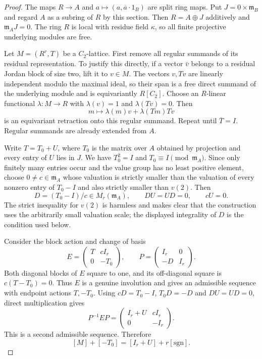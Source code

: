 \begin{proof}
The maps $R\to A$ and
$a\mapsto(a,\overline a\cdot1_B)$ are split ring maps. Put
$J=0\times\mathfrak m_B$ and regard $A$ as a subring of $R$ by this
section. Then $R=A\oplus J$ additively and $\mathfrak m_AJ=0$.
The ring $R$ is local with residue field $\kappa$, so all finite
projective underlying modules are free.

Let $M=(R^r,T)$ be a $C_2$-lattice. First remove all regular summands
of its residual representation. To justify this directly, if a vector
$\bar v$ belongs to a residual Jordan block of size two, lift it to
$v\in M$. The vectors $v,Tv$ are linearly independent modulo the
maximal ideal, so their span is a free direct summand of the underlying
module and is equivariantly $R[C_2]$. Choose an $R$-linear functional
$\lambda:M\to R$ with $\lambda(v)=1$ and $\lambda(Tv)=0$.
Then
\[
             m\longmapsto\lambda(m)v+\lambda(Tm)Tv
\]
is an equivariant retraction onto this regular summand. Repeat until
$\overline T=I$. Regular summands are already extended from $A$.

Write $T=T_0+U$, where $T_0$ is the matrix over $A$ obtained by
projection and every entry of $U$ lies in $J$. We have $T_0^2=I$
and $T_0\equiv I\pmod{\mathfrak m_A}$.
Since only finitely many entries occur and the value group has no
least positive element, choose $0\ne c\in\mathfrak m_A$ whose
valuation is strictly smaller than the valuation of every nonzero
entry of $T_0-I$ and also strictly smaller than $v(2)$. Then
\[
           D=(T_0-I)/c\in M_r(\mathfrak m_A),
           \qquad DU=UD=0,\qquad cU=0.
\]
The strict inequality for $v(2)$ is harmless and makes clear that the
construction uses the arbitrarily small valuation scale; the displayed
integrality of $D$ is the condition used below.

Consider the block action and change of basis
\[
 E=\begin{pmatrix}T&cI_r\\0&-T_0\end{pmatrix},
 \qquad P=\begin{pmatrix}I_r&0\\-D&I_r\end{pmatrix}.
\]
Both diagonal blocks of $E$ square to one, and its off-diagonal square
is $c(T-T_0)=0$. Thus $E$ is a genuine involution and gives an
admissible sequence with endpoint actions $T,-T_0$.
Using $cD=T_0-I$, $T_0D=-D$ and $DU=UD=0$, direct multiplication gives
\[
                 P^{-1}EP=
                  \begin{pmatrix}I_r+U&cI_r\\0&-I_r\end{pmatrix}.
\]
This is a second admissible sequence. Therefore
\[
                  [M]+[-T_0]=[I_r+U]+r[\mathrm{sgn}].       \tag{C.NT1}
\]


\end{proof}

